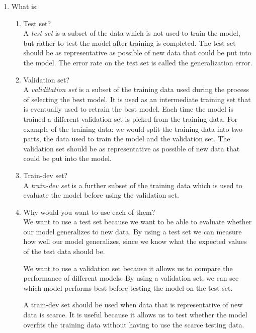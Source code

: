\documentclass[a4paper,10pt]{article}
\begin{document}
\begin{enumerate}
	\item What is:
	\begin{enumerate}
		\item Test set? \\
		A \emph{test set} is a subset of the data which is not used to train the model, but rather to test the model after training is completed. 
		The test set should be as representative as possible of new data that could be put into the model. 
		The error rate on the test set is called the generalization error.
		
		\item Validation set? \\
		A \emph{validitation set} is a subset of the training data used during the process of selecting the best model.
		It is used as an intermediate training set that is eventually used to retrain the best model.
		Each time the model is trained a different validation set is picked from the training data.
		For example of the training data: we would split the training data into two parts, the data used to train the model and the validation set.
		The validation set should be as representative as possible of new data that could be put into the model. 
		
		\item Train-dev set? \\
		A \emph{train-dev set} is a further subset of the training data which is used to evaluate the model before using the validation set.
		
		\item Why would you want to use each of them? \\
		We want to use a test set because we want to be able to evaluate whether our model generalizes to new data. By using a test set we can measure how well our model generalizes, since we know what the expected values of the test data should be.
		
		We want to use a validation set because it allows us to compare the performance of different models. 
		By using a validation set, we can see which model performs best before testing the model on the test set.
		
		A train-dev set should be used when data that is representative of new data is scarce.
		It is useful because it allows us to test whether the model overfits the training data without having to use the scarce testing data.
		

\end{enumerate}
\end{enumerate}
\end{document}
